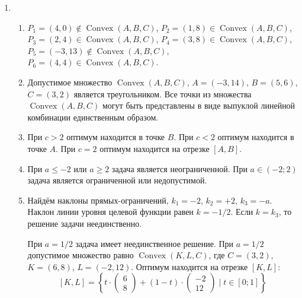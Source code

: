 \documentclass[12pt]{article}
\DeclareMathOperator{\Convex}{Convex}
\DeclareMathOperator{\hull}{\Convex}
\begin{document}
\begin{enumerate}
\begin{enumerate}
  \end{enumerate}
  \item %
  \begin{enumerate}
    \item $P_1 = (4, 0) \notin \hull(A, B, C)$, $P_2 = (1, 8) \in \hull(A, B, C)$, 
    $P_3 = (2, 4) \in \hull(A, B, C)$, $P_4 = (3, 8) \in \hull(A, B, C)$,
    $P_5 = (-3, 13) \notin \hull(A, B, C)$, $P_6 = (4, 4)   \in \hull(A, B, C)$. 
    \item Допустимое множество $\hull(A, B, C)$, $A = (-3, 14)$, $B = (5, 6)$, $C = (3, 2)$ является треугольником. 
    Все точки из множества $\hull(A, B, C)$ могут быть представлены в виде выпуклой линейной комбинации единственным образом. 
    \item При $c > 2$ оптимум находится в точке $B$. 
    При $c < 2$ оптимум находится в точке $A$. 
    При $c = 2$ оптимум находится на отрезке $[A, B]$.
    \item При $a \leq -2$ или $a \geq 2$ задача является неограниченной. 
    При $a \in (-2; 2)$ задача является ограниченной или недопустимой. 
    \item Найдём наклоны прямых-ограничений, $k_1 = -2$, $k_2 = +2$, $k_3 = -a$.
    Наклон линии уровня целевой функции равен $k = -1/2$.
    Если $k = k_3$, то решение задачи неединственно.
    
  

    При $a = 1/2$ задача имеет неединственное решение. 
    При $a = 1/2$ допустимое множество равно $\hull(K, L, C)$, где $C = (3, 2)$, $K = (6, 8)$, $L=(-2, 12)$.
    Оптимум находится на отрезке $[K, L]$: 
    \[
    [K, L] =  \left\{  t \cdot \begin{pmatrix}
      6 \\
      8
    \end{pmatrix}  + (1 - t)  \cdot \begin{pmatrix}
      -2 \\
      12
    \end{pmatrix}   \mid t \in [0;1] \right\}
    \]


  \end{enumerate}


\end{enumerate}
\end{document}
